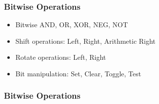 \begin{frame}
    \frametitle{Bitwise Operations}
    \begin{itemize}
        \item Bitwise AND, OR, XOR, NEG, NOT
        \item Shift operations: Left, Right, Arithmetic Right
        \item Rotate operations: Left, Right
        \item Bit manipulation: Set, Clear, Toggle, Test
    \end{itemize}
\end{frame}

\begin{frame}
    \frametitle{Bitwise Operations}
\end{frame}